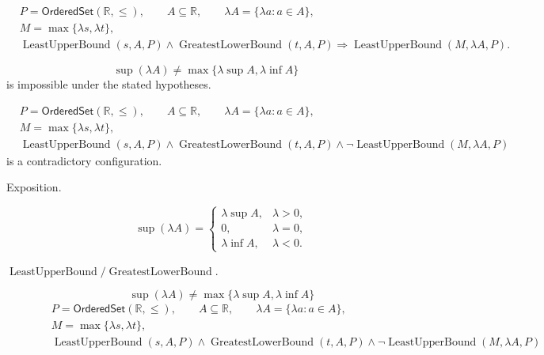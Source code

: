 \begin{remark*}
\[
\begin{aligned}
&P=\mathsf{OrderedSet}(\mathbb{R},\leq),\qquad A\subseteq\mathbb{R},\qquad \lambda A=\{\lambda a:a\in A\},\\
&M=\max\{\lambda s,\lambda t\},\\
&\operatorname{LeastUpperBound}(s,A,P)\land \operatorname{GreatestLowerBound}(t,A,P)
\Longrightarrow
\operatorname{LeastUpperBound}(M,\lambda A,P).
\end{aligned}
\]
\end{remark*}

\begin{remark*}
\[
\sup(\lambda A)\ne \max\{\lambda\sup A,\lambda\inf A\}
\]
is impossible under the stated hypotheses.
\end{remark*}

\begin{remark*}
\[
\begin{aligned}
&P=\mathsf{OrderedSet}(\mathbb{R},\leq),\qquad A\subseteq\mathbb{R},\qquad \lambda A=\{\lambda a:a\in A\},\\
&M=\max\{\lambda s,\lambda t\},\\
&\operatorname{LeastUpperBound}(s,A,P)\land \operatorname{GreatestLowerBound}(t,A,P)
\land
\neg\operatorname{LeastUpperBound}(M,\lambda A,P)
\end{aligned}
\]
is a contradictory configuration.
\end{remark*}

\begin{remark*}
\begin{description}
  \item[Exposition.]
\[
\sup(\lambda A)=
\begin{cases}
\lambda\sup A, & \lambda>0,\\
0, & \lambda=0,\\
\lambda\inf A, & \lambda<0.
\end{cases}
\]


  \item[\(\operatorname{LeastUpperBound} / \operatorname{GreatestLowerBound}.\)]
  \[
\sup(\lambda A)\ne \max\{\lambda\sup A,\lambda\inf A\}
\]
\[
\begin{aligned}
&P=\mathsf{OrderedSet}(\mathbb{R},\leq),\qquad A\subseteq\mathbb{R},\qquad \lambda A=\{\lambda a:a\in A\},\\
&M=\max\{\lambda s,\lambda t\},\\
&\operatorname{LeastUpperBound}(s,A,P)\land \operatorname{GreatestLowerBound}(t,A,P)
\land
\neg\operatorname{LeastUpperBound}(M,\lambda A,P)
\end{aligned}
\]
\end{description}
\end{remark*}

